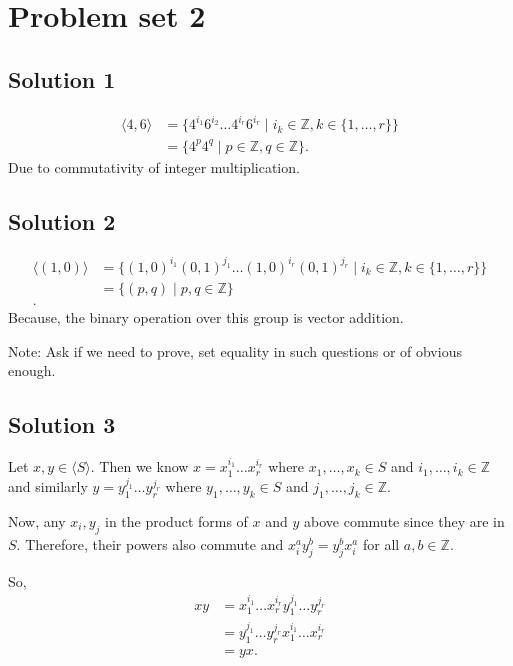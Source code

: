 \section{Problem set 2}      

\subsection{Solution 1}

\begin{align*}
  \langle 4,6 \rangle &= \{4^{i_{1}}6^{i_{2}} \ldots 4^{i_{r}}6^{i_{r}} \mid i_{k} \in \mathbb{Z}, k \in \{1,\ldots,r\}   \}   \\
&= \{4^{p}4^{q} \mid p \in \mathbb{Z}, q \in \mathbb{Z}\} 
.\end{align*}
Due to commutativity of integer multiplication.

\subsection{Solution 2}
\begin{align*}
  \langle \left( 1,0 \right) \rangle &= \{\left( 1,0 \right)^{i_{1}}\left( 0,1 \right)^{j_{1}} \ldots \left( 1,0 \right)^{i_{r}}\left( 0,1 \right)^{j_{r}} \mid i_{k} \in \mathbb{Z}, k \in \{1,\ldots,r\} \}    \\
                                     &= \{\left( p,q \right) \mid p,q \in \mathbb{Z}\} \\
.\end{align*}
Because, the binary operation over this group is vector addition.

Note: Ask if we need to prove, set equality in such questions or of obvious enough.
\subsection{Solution 3}
Let \( x, y \in \langle S \rangle \). Then we know \( x = x_{1}^{i_{1}}\ldots x_{r}^{i_{r}} \) where \( x_{1}, \ldots, x_{k} \in S\) and \( i_{1},\ldots,i_{k} \in \mathbb{Z}\) and
similarly \( y = y_{1}^{j_{1}}\ldots y_{r}^{j_{r}} \) where \( y_{1}, \ldots, y_{k} \in S\) and \( j_{1},\ldots,j_{k} \in \mathbb{Z}\).

Now, any \( x_{i}, y_{j}\) in the product forms of \( x  \) and \( y \) above commute since they are in \( S \).
Therefore, their powers also commute and \( x_{i}^{a} y_{j}^{b} =  y_{j}^{b} x_{i}^{a}\) for all \( a,b  \in \mathbb{Z}\).

So,
\begin{align*}
  xy &=x_{1}^{i_{1}}\ldots x_{r}^{i_{r}} y_{1}^{j_{1}}\ldots y_{r}^{j_{r}} \\
  &= y_{1}^{j_{1}}\ldots y_{r}^{j_{r}} x_{1}^{i_{1}}\ldots x_{r}^{i_{r}}\\
  &= yx
.\end{align*}

